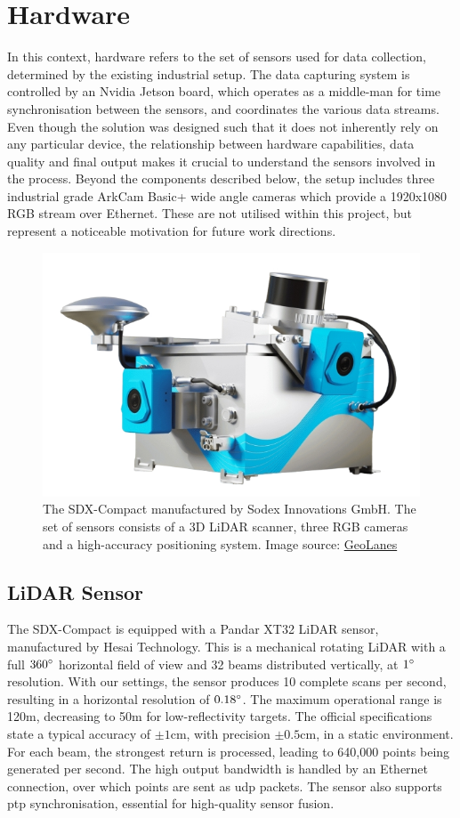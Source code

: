\section{Hardware}

In this context, hardware refers to the set of sensors used for data collection, determined by the existing industrial setup. The data capturing system is controlled by an Nvidia Jetson board, which operates as a middle-man for time synchronisation between the sensors, and coordinates the various data streams. Even though the solution was designed such that it does not inherently rely on any particular device, the relationship between hardware capabilities, data quality and final output makes it crucial to understand the sensors involved in the process. Beyond the components described below, the setup includes three industrial grade ArkCam Basic+ wide angle cameras which provide a 1920x1080 RGB stream over Ethernet. These are not utilised within this project, but represent a noticeable motivation for future work directions.

\begin{figure}
	\centering
	\includegraphics[width=0.6\linewidth]{images/sdx-compact-on-top-nobg.png}
	\caption[SDX-Compact]{The SDX-Compact manufactured by Sodex Innovations GmbH. The set of sensors consists of a 3D LiDAR scanner, three RGB cameras and a high-accuracy positioning system. Image source: \href{https://www.geo-lanes.com/sodex-innovations/}{GeoLanes}}
	\label{fig:sdx-compact}
\end{figure}

\subsection{LiDAR Sensor}

The SDX-Compact  is equipped with a Pandar XT32 \cite{hesai_xt16_32_32m} LiDAR sensor, manufactured by Hesai Technology. This is a mechanical rotating LiDAR with a full $360 \degree$ horizontal field of view and 32 beams distributed vertically, at $1 \degree$ resolution. With our settings, the sensor produces 10 complete scans per second, resulting in a horizontal resolution of $0.18 \degree$. The maximum operational range is 120m, decreasing to 50m for low-reflectivity targets. The official specifications state a typical accuracy of $\pm 1$cm, with precision $\pm 0.5$cm, in a static environment. For each beam, the strongest return is processed, leading to 640,000 points being generated per second. The high output bandwidth is handled by an Ethernet connection, over which points are sent as \acrshort{udp} packets. The sensor also supports \acrshort{ptp} synchronisation, essential for high-quality sensor fusion.

